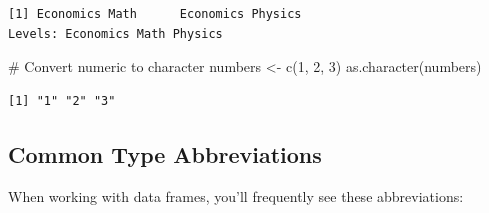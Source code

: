 \documentclass[
  letterpaper,
  DIV=11,
  numbers=noendperiod]{scrreprt}
\newenvironment{Shaded}{\begin{snugshade}}{\end{snugshade}}
\newcommand{\CommentTok}[1]{\textcolor[rgb]{0.37,0.37,0.37}{#1}}
\newcommand{\DecValTok}[1]{\textcolor[rgb]{0.68,0.00,0.00}{#1}}
\newcommand{\FunctionTok}[1]{\textcolor[rgb]{0.28,0.35,0.67}{#1}}
\newcommand{\NormalTok}[1]{\textcolor[rgb]{0.00,0.23,0.31}{#1}}
\newcommand{\OtherTok}[1]{\textcolor[rgb]{0.00,0.23,0.31}{#1}}
\begin{document}
\begin{verbatim}
[1] Economics Math      Economics Physics  
Levels: Economics Math Physics
\end{verbatim}

\begin{Shaded}
\begin{Highlighting}[]
\CommentTok{\# Convert numeric to character}
\NormalTok{numbers }\OtherTok{\textless{}{-}} \FunctionTok{c}\NormalTok{(}\DecValTok{1}\NormalTok{, }\DecValTok{2}\NormalTok{, }\DecValTok{3}\NormalTok{)}
\FunctionTok{as.character}\NormalTok{(numbers)}
\end{Highlighting}
\end{Shaded}

\begin{verbatim}
[1] "1" "2" "3"
\end{verbatim}

\subsection{Common Type Abbreviations}\label{common-type-abbreviations}

When working with data frames, you'll frequently see these
abbreviations:
\end{document}
